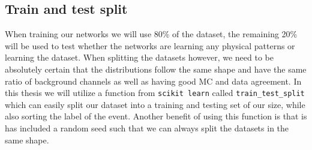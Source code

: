 \documentclass[14pt, a4paper]{book}
\begin{document}
\subsection{Train and test split}\label{sec:train_test}
When training our networks we will use 80\% of the dataset, the remaining 20\% will be used to test whether the networks are learning any physical patterns or learning the dataset. When splitting the datasets however, we need to be absolutely certain that the distributions 
follow the same shape and have the same ratio of background channels as well as having good MC and data agreement. In this thesis we will utilize a function from \verb|scikit learn| \cite{scikit-learn} called \verb|train_test_split| which can easily split our dataset into 
a training and testing set of our size, while also sorting the label of the event. Another benefit of using this function is that is has included a random seed such that we can always split the datasets in the same shape.
\graphicspath{{../../../Plots/NeuralNetwork/FULL/}}
\end{document}
